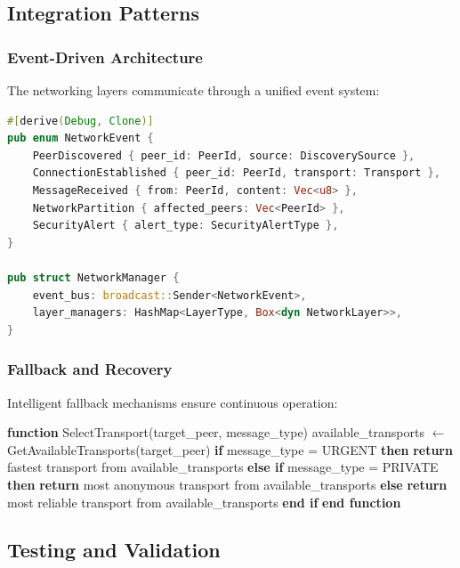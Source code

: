 \documentclass[11pt,a4paper]{article}
\theoremstyle{definition}
\theoremstyle{remark}
\begin{document}
\subsection{Integration Patterns}

\subsubsection{Event-Driven Architecture}

The networking layers communicate through a unified event system:

\begin{lstlisting}[language=Rust, caption=Network Event System]
#[derive(Debug, Clone)]
pub enum NetworkEvent {
    PeerDiscovered { peer_id: PeerId, source: DiscoverySource },
    ConnectionEstablished { peer_id: PeerId, transport: Transport },
    MessageReceived { from: PeerId, content: Vec<u8> },
    NetworkPartition { affected_peers: Vec<PeerId> },
    SecurityAlert { alert_type: SecurityAlertType },
}

pub struct NetworkManager {
    event_bus: broadcast::Sender<NetworkEvent>,
    layer_managers: HashMap<LayerType, Box<dyn NetworkLayer>>,
}
\end{lstlisting}

\subsubsection{Fallback and Recovery}

Intelligent fallback mechanisms ensure continuous operation:

\begin{algorithm}
\caption{Adaptive Transport Selection}
\begin{algorithmic}[1]
\STATE \textbf{function} SelectTransport(target\_peer, message\_type)
    \STATE available\_transports $\leftarrow$ GetAvailableTransports(target\_peer)
    \STATE \textbf{if} message\_type = URGENT \textbf{then}
        \STATE \textbf{return} fastest transport from available\_transports
    \STATE \textbf{else if} message\_type = PRIVATE \textbf{then}
        \STATE \textbf{return} most anonymous transport from available\_transports
    \STATE \textbf{else}
        \STATE \textbf{return} most reliable transport from available\_transports
    \STATE \textbf{end if}
\STATE \textbf{end function}
\end{algorithmic}
\end{algorithm}

\subsection{Testing and Validation}
\end{document}

